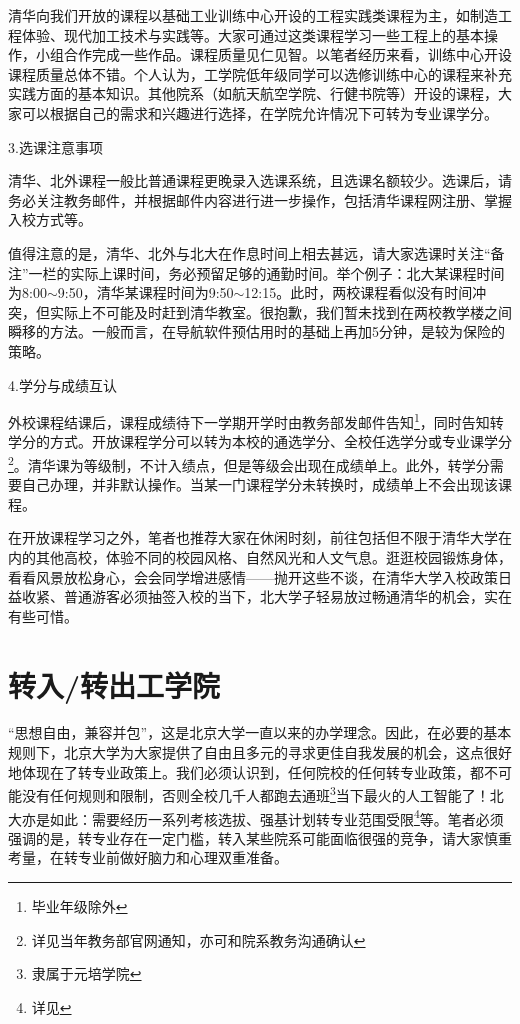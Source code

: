 \documentclass[11pt,oneside]{book}
\begin{document}
清华向我们开放的课程以基础工业训练中心开设的工程实践类课程为主，如制造工程体验、现代加工技术与实践等。大家可通过这类课程学习一些工程上的基本操作，小组合作完成一些作品。课程质量见仁见智。以笔者经历来看，训练中心开设课程质量总体不错。个人认为，工学院低年级同学可以选修训练中心的课程来补充实践方面的基本知识。其他院系（如航天航空学院、行健书院等）开设的课程，大家可以根据自己的需求和兴趣进行选择，在学院允许情况下可转为专业课学分。

\vspace{10pt}

3.选课注意事项

清华、北外课程一般比普通课程更晚录入选课系统，且选课名额较少。选课后，请务必关注教务邮件，并根据邮件内容进行进一步操作，包括清华课程网注册、掌握入校方式等。

值得注意的是，清华、北外与北大在作息时间上相去甚远，请大家选课时关注“备注”一栏的实际上课时间，务必预留足够的通勤时间。举个例子：北大某课程时间为8:00$\sim$9:50，清华某课程时间为9:50$\sim$12:15。此时，两校课程看似没有时间冲突，但实际上不可能及时赶到清华教室。很抱歉，我们暂未找到在两校教学楼之间瞬移的方法。一般而言，在导航软件预估用时的基础上再加5分钟，是较为保险的策略。

\vspace{10pt}

4.学分与成绩互认

外校课程结课后，课程成绩待下一学期开学时由教务部发邮件告知\footnote{毕业年级除外}，同时告知转学分的方式。开放课程学分可以转为本校的通选学分、全校任选学分或专业课学分\footnote{详见当年教务部官网通知，亦可和院系教务沟通确认}。清华课为等级制，不计入绩点，但是等级会出现在成绩单上。此外，转学分需要自己办理，并非默认操作。当某一门课程学分未转换时，成绩单上不会出现该课程。

\vspace{10pt}

在开放课程学习之外，笔者也推荐大家在休闲时刻，前往包括但不限于清华大学在内的其他高校，体验不同的校园风格、自然风光和人文气息。逛逛校园锻炼身体，看看风景放松身心，会会同学增进感情——抛开这些不谈，在清华大学入校政策日益收紧、普通游客必须抽签入校的当下，北大学子轻易放过畅通清华的机会，实在有些可惜。

\section{转入/转出工学院}
“思想自由，兼容并包”，这是北京大学一直以来的办学理念。因此，在必要的基本规则下，北京大学为大家提供了自由且多元的寻求更佳自我发展的机会，这点很好地体现在了转专业政策上。我们必须认识到，任何院校的任何转专业政策，都不可能没有任何规则和限制，否则全校几千人都跑去通班\footnote{隶属于元培学院}当下最火的人工智能了！北大亦是如此：需要经历一系列考核选拔、强基计划转专业范围受限\footnote{详见}等。笔者必须强调的是，转专业存在一定门槛，转入某些院系可能面临很强的竞争，请大家慎重考量，在转专业前做好脑力和心理双重准备。
\end{document}
